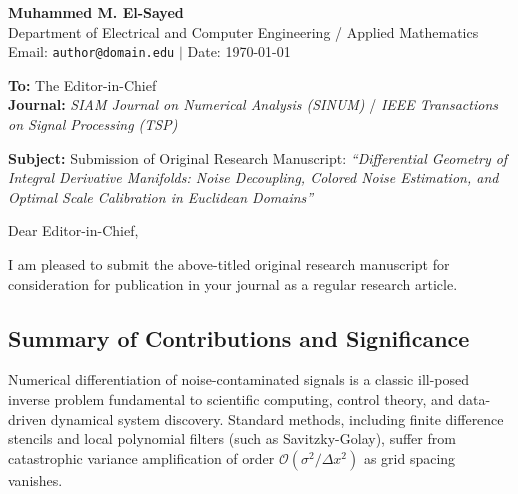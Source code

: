 \documentclass[11pt,a4paper]{article}
\begin{document}
\noindent
\textbf{Muhammed M. El-Sayed}\\
Department of Electrical and Computer Engineering / Applied Mathematics\\
Email: \texttt{author@domain.edu} \quad $|$ \quad Date: \today

\vspace{1.5em}

\noindent
\textbf{To:} The Editor-in-Chief\\
\textbf{Journal:} \emph{SIAM Journal on Numerical Analysis (SINUM)} / \emph{IEEE Transactions on Signal Processing (TSP)}

\vspace{1.5em}

\noindent
\textbf{Subject:} Submission of Original Research Manuscript: \emph{``Differential Geometry of Integral Derivative Manifolds: Noise Decoupling, Colored Noise Estimation, and Optimal Scale Calibration in Euclidean Domains''}

\vspace{1em}

\noindent
Dear Editor-in-Chief,

I am pleased to submit the above-titled original research manuscript for consideration for publication in your journal as a regular research article.

\subsection*{Summary of Contributions and Significance}
Numerical differentiation of noise-contaminated signals is a classic ill-posed inverse problem fundamental to scientific computing, control theory, and data-driven dynamical system discovery. Standard methods, including finite difference stencils and local polynomial filters (such as Savitzky-Golay), suffer from catastrophic variance amplification of order $\mathcal{O}(\sigma^2 / \Delta x^2)$ as grid spacing vanishes.
\end{document}
